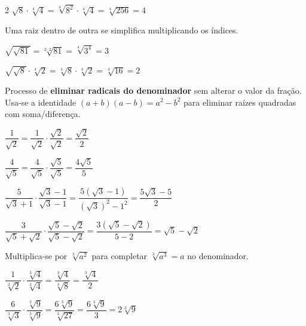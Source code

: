 \documentclass[12pt]{article}
\begin{document}
\begin{multicols}{2}
$\sqrt{8} \cdot \sqrt[4]{4} = \sqrt[4]{8^2} \cdot \sqrt[4]{4} = \sqrt[4]{256} = 4$



Uma raiz dentro de outra se simplifica multiplicando os índices.

$\sqrt{\sqrt{81}} = \sqrt[2\cdot2]{81} = \sqrt[4]{3^4} = 3$ \vspace{4px}

$\sqrt{\sqrt{8}} \cdot \sqrt[4]{2} = \sqrt[4]{8} \cdot \sqrt[4]{2} = \sqrt[4]{16} = 2$


Processo de \textbf{eliminar radicais do denominador} sem alterar o valor da fração. Usa-se a identidade $(a+b)(a-b) = a^2 - b^2$ para eliminar raízes quadradas com soma/diferença.


$\dfrac{1}{\sqrt{2}} = \dfrac{1}{\sqrt{2}} \cdot \dfrac{\sqrt{2}}{\sqrt{2}} = \dfrac{\sqrt{2}}{2}$ \vspace{6px}

$\dfrac{4}{\sqrt{5}} = \dfrac{4}{\sqrt{5}} \cdot \dfrac{\sqrt{5}}{\sqrt{5}} = \dfrac{4\sqrt{5}}{5}$ \vspace{6px}


$\dfrac{5}{\sqrt{3}+1} \cdot \dfrac{\sqrt{3}-1}{\sqrt{3}-1} = \dfrac{5(\sqrt{3}-1)}{(\sqrt{3})^2 - 1^2} = \dfrac{5\sqrt{3}-5}{2}$ \vspace{6px}

$\dfrac{3}{\sqrt{5}+\sqrt{2}} \cdot \dfrac{\sqrt{5}-\sqrt{2}}{\sqrt{5}-\sqrt{2}} = \dfrac{3(\sqrt{5}-\sqrt{2})}{5-2} = \sqrt{5} - \sqrt{2}$ \vspace{6px}


Multiplica-se por $\sqrt[3]{a^2}$ para completar $\sqrt[3]{a^3} = a$ no denominador.

$\dfrac{1}{\sqrt[3]{2}} \cdot \dfrac{\sqrt[3]{4}}{\sqrt[3]{4}} = \dfrac{\sqrt[3]{4}}{\sqrt[3]{8}} = \dfrac{\sqrt[3]{4}}{2}$ \vspace{6px}

$\dfrac{6}{\sqrt[3]{3}} \cdot \dfrac{\sqrt[3]{9}}{\sqrt[3]{9}} = \dfrac{6\sqrt[3]{9}}{\sqrt[3]{27}} = \dfrac{6\sqrt[3]{9}}{3} = 2\sqrt[3]{9}$

\end{multicols}
\end{document}
